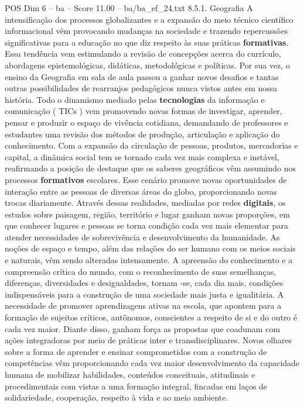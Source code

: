 \begin{textsample}{POS Dim 6 – ba – Score 11.00 – ba/ba\_ef\_24.txt}  \label{ex:f6_pos_071}
8.5.1.
Geografia A intensificação dos processos globalizantes e a expansão do meio técnico científico informacional vêm provocando mudanças na sociedade e trazendo repercussões significativas para a educação no que diz respeito às suas práticas \textbf{formativas}.
Essa tendência vem estimulando a revisão de concepções acerca do currículo, abordagens epistemológicas, didáticas, metodológicas e políticas.
Por sua vez, o ensino da Geografia em sala de aula passou a ganhar novos desafios e tantas outras possibilidades de rearranjos pedagógicos nunca vistos antes em nossa história.
Todo o dinamismo mediado pelas \textbf{tecnologias} da informação e comunicação ( TICs ) vem promovendo novas formas de investigar, aprender, pensar e produzir o espaço de vivência cotidiana, demandando de professores e estudantes uma revisão dos métodos de produção, articulação e aplicação do conhecimento.
Com a expansão da circulação de pessoas, produtos, mercadorias e capital, a dinâmica social tem se tornado cada vez mais complexa e instável, reafirmando a posição de destaque que os saberes geográficos vêm assumindo nos processos \textbf{formativos} escolares.
Esse cenário promove novas oportunidades de interação entre as pessoas de diversas áreas do globo, proporcionando novas trocas diariamente.
Através dessas realidades, mediadas por redes \textbf{digitais}, os estudos sobre paisagem, região, território e lugar ganham novas proporções, em que conhecer lugares e pessoas se torna condição cada vez mais elementar para atender necessidades de sobrevivência e desenvolvimento da humanidade.
As noções de espaço e tempo, além das relações do ser humano com os meios sociais e naturais, vêm sendo alteradas intensamente.
A apreensão do conhecimento e a compreensão crítica do mundo, com o reconhecimento de suas semelhanças, diferenças, diversidades e desigualdades, tornam -se, cada dia mais, condições indispensáveis para a construção de uma sociedade mais justa e igualitária.
A necessidade de promover aprendizagens ativas na escola, que apontem para a formação de sujeitos críticos, autônomos, conscientes a respeito de si e do outro é cada vez maior.
Diante disso, ganham força as propostas que coadunam com ações integradoras por meio de práticas inter e transdisciplinares.
Novos olhares sobre a forma de aprender e ensinar comprometidos com a construção de competências vêm proporcionando cada vez maior desenvolvimento da capacidade humana de mobilizar habilidades, conteúdos conceituais, atitudinais e procedimentais com vistas a uma formação integral, fincadas em laços de solidariedade, cooperação, respeito à vida e ao meio ambiente.

\end{textsample}
